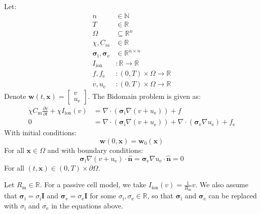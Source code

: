 \documentclass{article}
\newcommand{\bvec}[1]{\boldsymbol{#1}}
\newcommand{\brvec}[1]{\mathbf{#1}}
\newcommand{\bmat}[1]{\boldsymbol{#1}}
\newcommand{\brmat}[1]{\mathbf{#1}}
\begin{document}
Let:
\begin{align*}
    n & \in \mathbb{N} \\
    T & \in \mathbb{R} \\
    \Omega & \subseteq \mathbb{R}^n \\
    \chi, C_m & \in \mathbb{R} \\
    \bmat{\sigma}_\text{i}, \bmat{\sigma}_\text{e} & \in \mathbb{R}^{n \times n} \\
    I_\text{ion} & : \mathbb{R} \rightarrow \mathbb{R} \\
    f, f_\text{e} & : (0, T) \times \Omega \rightarrow \mathbb{R} \\
    v, u_\text{e} & : (0, T) \times \Omega \rightarrow \mathbb{R}
\end{align*}
Denote $\bvec{w}(t, \bvec{x}) = \begin{bmatrix}
    v \\
    u_\text{e}
\end{bmatrix}$. The Bidomain problem is given as:
\begin{align} \label{eq1}
    \chi C_\text{m} \frac{\partial v}{\partial t}
        + \chi I_\text{ion}(v)
        & = \nabla \cdot (\bmat{\sigma}_\text{i} \nabla (v + u_\text{e}))
        + f \\
    \label{eq2}
    0
        & = \nabla \cdot (\bmat{\sigma}_\text{i} \nabla (v + u_\text{e}))
        + \nabla \cdot (\bmat{\sigma}_\text{e} \nabla u_\text{e})
        + f_\text{e}
\end{align}
\noindent With initial conditions:
\begin{equation}
    \bvec{w}(0, \bvec{x}) = \bvec{w}_0(\bvec{x})
\end{equation}
\noindent For all $\bvec{x} \in \Omega$ and with boundary conditions:
\begin{equation} \label{BCs}
    \bmat{\sigma}_\text{i} \nabla (v + u_\text{e}) \cdot \hat{\brvec{n}}
        = \bmat{\sigma}_\text{e} \nabla u_\text{e} \cdot \hat{\brvec{n}}
        = 0
\end{equation}
\noindent For all $(t, \bvec{x}) \in (0, T) \times \partial \Omega$.

Let $R_\text{m} \in \mathbb{R}$.
For a passive cell model, we take $I_\text{ion}(v) = \frac{1}{R_\text{m}} v$.
We also assume that $\bmat{\sigma}_\text{i} = \sigma_\text{i} \brmat{I}$
and $\bmat{\sigma}_\text{e} = \sigma_\text{e} \brmat{I}$
for some $\sigma_\text{i}, \sigma_\text{e} \in \mathbb{R}$,
so that $\bmat{\sigma}_\text{i}$ and $\bmat{\sigma}_\text{e}$
can be replaced with $\sigma_\text{i}$ and $\sigma_\text{e}$
in the equations above.
\end{document}
